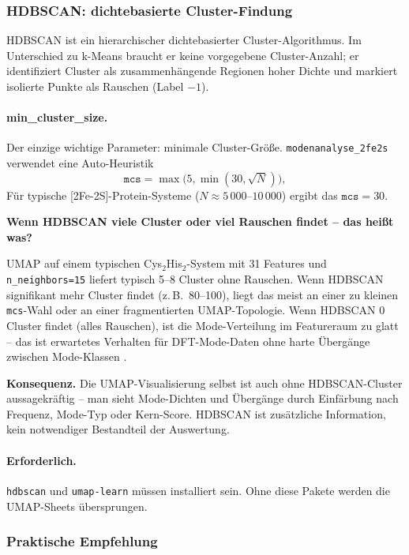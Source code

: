 \documentclass[11pt,a4paper,twoside]{article}
\theoremstyle{remark}
\begin{document}
\subsubsection*{HDBSCAN: dichtebasierte Cluster-Findung}

HDBSCAN \cite{Campello2013,McInnes2017} ist ein hierarchischer
dichtebasierter Cluster-Algorithmus. Im Unterschied zu k-Means braucht
er keine vorgegebene Cluster-Anzahl; er identifiziert Cluster als
zusammenh\"angende Regionen hoher Dichte und markiert isolierte
Punkte als Rauschen (Label $-1$).

\paragraph{min\_cluster\_size.} Der einzige wichtige Parameter:
minimale Cluster-Gr\"o\ss e. \texttt{modenanalyse\_2fe2s} verwendet eine
Auto-Heuristik
\[
  \texttt{mcs} = \max\bigl(5, \min(30, \sqrt{N})\bigr),
\]
F\"ur typische [2Fe-2S]-Protein-Systeme ($N \approx 5\,000$--$10\,000$) ergibt das
$\texttt{mcs} = 30$.

\begin{infobox}
\textbf{Wenn HDBSCAN viele Cluster oder viel Rauschen findet --
das hei\ss t was?}

UMAP auf einem typischen Cys$_2$His$_2$-System mit 31 Features und
\texttt{n\_neighbors=15} liefert typisch 5--8 Cluster ohne Rauschen.
Wenn HDBSCAN signifikant mehr Cluster findet (z.\,B.\ 80--100), liegt
das meist an einer zu kleinen \texttt{mcs}-Wahl oder an einer
fragmentierten UMAP-Topologie. Wenn HDBSCAN 0 Cluster findet
(alles Rauschen), ist die Mode-Verteilung im Featureraum zu glatt --
das ist erwartetes Verhalten f\"ur DFT-Mode-Daten ohne harte
\"Uberg\"ange zwischen Mode-Klassen \cite{Campello2013}.

\textbf{Konsequenz.} Die UMAP-Visualisierung selbst ist auch ohne
HDBSCAN-Cluster aussagekr\"aftig -- man sieht Mode-Dichten und
\"Uberg\"ange durch Einf\"arbung nach Frequenz, Mode-Typ oder
Kern-Score. HDBSCAN ist zus\"atzliche Information, kein notwendiger
Bestandteil der Auswertung.
\end{infobox}

\paragraph{Erforderlich.} \texttt{hdbscan} und \texttt{umap-learn}
m\"ussen installiert sein. Ohne diese Pakete werden die UMAP-Sheets
\"ubersprungen.

\subsubsection*{Praktische Empfehlung}
\end{document}
